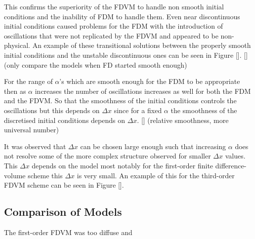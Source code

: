 \documentclass[SingleSpace,12pt,Proceedings]{Serre_ASCE}
\begin{document}
This confirms the superiority of the FDVM to handle non smooth initial conditions and the inability of FDM to handle them. Even near discontinuous initial conditions caused problems for the FDM with the introduction of oscillations that were not replicated by the FDVM and appeared to be non-physical. An example of these transitional solutions between the properly smooth initial conditions and the unstable discontinuous ones can be seen in Figure []. [](only compare the models when FD started smooth enough)

For the range of $\alpha$'s which are smooth enough for the FDM to be appropriate then as $\alpha$ increases the number of oscillations increases as well for both the FDM and the FDVM. So that the smoothness of the initial conditions controls the oscillations but this depends on $\Delta x$ since for a fixed $\alpha$ the smoothness of the discretised initial conditions depends on $\Delta x$. [] (relative smoothness, more universal number)

It was observed that $\Delta x$ can be chosen large enough such that increasing $\alpha$ does not resolve some of the more complex structure observed for smaller $\Delta x$ values. This $\Delta x$ depends on the model most notably for the first-order finite difference-volume scheme this $\Delta x$ is very small. An example of this for the third-order FDVM scheme can be seen in Figure []. 



\subsection{Comparison of Models}
The first-order FDVM was too diffuse and
\end{document}
